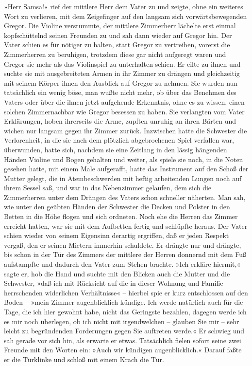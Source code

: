 »Herr Samsa!« rief der mittlere Herr dem Vater zu und zeigte, ohne ein
weiteres Wort zu verlieren, mit dem Zeigefinger auf den langsam sich
vorwärtsbewegenden Gregor. Die Violine verstummte, der mittlere
Zimmerherr lächelte erst einmal kopfschüttelnd seinen Freunden zu und
sah dann wieder auf Gregor hin. Der Vater schien es für nötiger zu
halten, statt Gregor zu vertreiben, vorerst die Zimmerherren zu
beruhigen, trotzdem diese gar nicht aufgeregt waren und Gregor sie mehr
als das Violinspiel zu unterhalten schien. Er eilte zu ihnen und suchte
sie mit ausgebreiteten Armen in ihr Zimmer zu drängen und gleichzeitig
mit seinem Körper ihnen den Ausblick auf Gregor zu nehmen. Sie wurden
nun tatsächlich ein wenig böse, man wußte nicht mehr, ob über das
Benehmen des Vaters oder über die ihnen jetzt aufgehende Erkenntnis,
ohne es zu wissen, einen solchen Zimmernachbar wie Gregor besessen zu
haben. Sie verlangten vom Vater Erklärungen, hoben ihrerseits die Arme,
zupften unruhig an ihren Bärten und wichen nur langsam gegen ihr Zimmer
zurück. Inzwischen hatte die Schwester die Verlorenheit, in die sie nach
dem plötzlich abgebrochenen Spiel verfallen war, überwunden, hatte sich,
nachdem sie eine Zeitlang in den lässig hängenden Händen Violine und
Bogen gehalten und weiter, als spiele sie noch, in die Noten gesehen
hatte, mit einem Male aufgerafft, hatte das Instrument auf den Schoß der
Mutter gelegt, die in Atembeschwerden mit heftig arbeitenden Lungen noch
auf ihrem Sessel saß, und war in das Nebenzimmer gelaufen, dem sich die
Zimmerherren unter dem Drängen des Vaters schon schneller näherten. Man
sah, wie unter den geübten Händen der Schwester die Decken und Polster
in den Betten in die Höhe flogen und sich ordneten. Noch ehe die Herren
das Zimmer erreicht hatten, war sie mit dem Aufbetten fertig und
schlüpfte heraus. Der Vater schien wieder von seinem Eigensinn derartig
ergriffen, daß er jeden Respekt vergaß, den er seinen Mietern immerhin
schuldete. Er drängte nur und drängte, bis schon in der Tür des Zimmers
der mittlere der Herren donnernd mit dem Fuß aufstampfte und dadurch den
Vater zum Stehen brachte. »Ich erkläre hiermit,« sagte er, hob die Hand
und suchte mit den Blicken auch die Mutter und die Schwester, »daß ich
mit Rücksicht auf die in dieser Wohnung und Familie herrschenden
widerlichen Verhältnisse« -- hierbei spie er kurz entschlossen auf den
Boden -- »mein Zimmer augenblicklich kündige. Ich werde natürlich auch
für die Tage, die ich hier gewohnt habe, nicht das Geringste bezahlen,
dagegen werde ich es mir noch überlegen, ob ich nicht mit irgendwelchen
-- glauben Sie mir -- sehr leicht zu begründenden Forderungen gegen Sie
auftreten werde.« Er schwieg und sah gerade vor sich hin, als erwarte er
etwas. Tatsächlich fielen sofort seine zwei Freunde mit den Worten ein:
»Auch wir kündigen augenblicklich.« Darauf faßte er die Türklinke und
schloß mit einem Krach die Tür.

